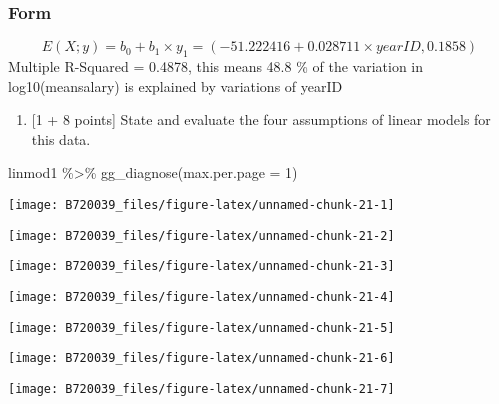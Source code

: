 \documentclass[
]{article}
\newenvironment{Shaded}{\begin{snugshade}}{\end{snugshade}}
\newcommand{\AttributeTok}[1]{\textcolor[rgb]{0.77,0.63,0.00}{#1}}
\newcommand{\DecValTok}[1]{\textcolor[rgb]{0.00,0.00,0.81}{#1}}
\newcommand{\FunctionTok}[1]{\textcolor[rgb]{0.00,0.00,0.00}{#1}}
\newcommand{\NormalTok}[1]{#1}
\newcommand{\SpecialCharTok}[1]{\textcolor[rgb]{0.00,0.00,0.00}{#1}}
\providecommand{\tightlist}{%
  \setlength{\itemsep}{0pt}\setlength{\parskip}{0pt}}
\begin{document}
\hypertarget{form}{%
\subsubsection{Form}\label{form}}

\[ E(X;y) = b_0 + b_1 \times y_1 = (-51.222416  + 0.028711 \times yearID, 0.1858)  \]
Multiple R-Squared = 0.4878, this means 48.8 \% of the variation in
log10(meansalary) is explained by variations of yearID

\begin{enumerate}
\def\labelenumi{\alph{enumi}.}
\setcounter{enumi}{2}
\tightlist
\item
  {[}1 + 8 points{]} State and evaluate the four assumptions of linear
  models for this data.
\end{enumerate}

\begin{Shaded}
\begin{Highlighting}[]
\NormalTok{linmod1 }\SpecialCharTok{\%\textgreater{}\%}
  \FunctionTok{gg\_diagnose}\NormalTok{(}\AttributeTok{max.per.page =} \DecValTok{1}\NormalTok{)}
\end{Highlighting}
\end{Shaded}

\begin{center}\texttt{[image: B720039\_files/figure-latex/unnamed-chunk-21-1]} \end{center}

\begin{center}\texttt{[image: B720039\_files/figure-latex/unnamed-chunk-21-2]} \end{center}

\begin{center}\texttt{[image: B720039\_files/figure-latex/unnamed-chunk-21-3]} \end{center}

\begin{center}\texttt{[image: B720039\_files/figure-latex/unnamed-chunk-21-4]} \end{center}

\begin{center}\texttt{[image: B720039\_files/figure-latex/unnamed-chunk-21-5]} \end{center}

\begin{center}\texttt{[image: B720039\_files/figure-latex/unnamed-chunk-21-6]} \end{center}

\begin{center}\texttt{[image: B720039\_files/figure-latex/unnamed-chunk-21-7]} \end{center}
\end{document}
